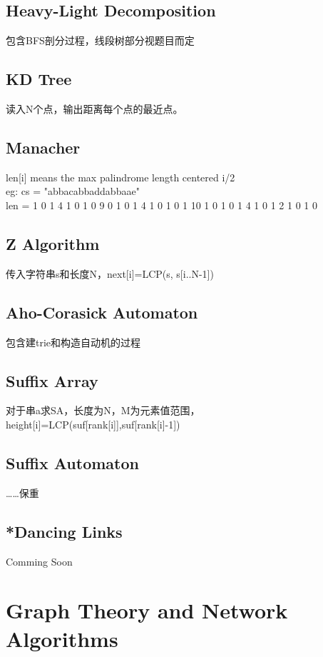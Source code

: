 \documentclass[a4paper,10pt]{report}
\begin{document}
	\section{Heavy-Light Decomposition}
	包含BFS剖分过程，线段树部分视题目而定
	
	
	\section{KD Tree}
	读入N个点，输出距离每个点的最近点。
	

	\section{Manacher}
	len[i] means the max palindrome length centered i/2\\
	eg: cs = "abbacabbaddabbaae"\\
	len = 1 0 1 4 1 0 1 0 9 0 1 0 1 4 1 0 1 0 1 10 1 0 1 0 1 4 1 0 1 2 1 0 1 0
	
	
	\section{Z Algorithm}
	传入字符串s和长度N，next[i]=LCP(s, s[i..N-1])
	

	\section{Aho-Corasick Automaton}
	包含建trie和构造自动机的过程
	

	\section{Suffix Array}
	对于串a求SA，长度为N，M为元素值范围，height[i]=LCP(suf[rank[i]],suf[rank[i]-1])
	

	\section{Suffix Automaton}
	……保重
	
	
	\section{*Dancing Links}
	Comming Soon

\chapter{Graph Theory and Network Algorithms}
\end{document}
